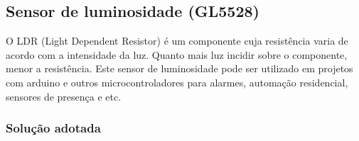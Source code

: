 \newpage

\subsection{Sensor de luminosidade (GL5528)}


O LDR (Light Dependent Resistor) é um componente cuja resistência varia de acordo com a intensidade da luz. Quanto mais luz incidir sobre o componente, menor a resistência. Este sensor de luminosidade pode ser utilizado em projetos com arduino e outros microcontroladores para alarmes, automação residencial, sensores de presença e etc.




\subsubsection{Solução adotada}

